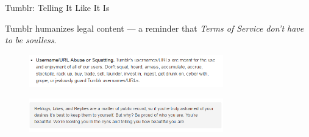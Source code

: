\begin{frame}{Tumblr: Telling It Like It Is}

Tumblr humanizes legal content — a reminder that \textit{Terms of Service don’t have to be soulless}\cite{TUMBLR}.
     \begin{figure}
        \centering
        \includegraphics[width=0.75\textwidth]{images/username.png}
        \label{fig:username}
    \end{figure}     
     \begin{figure}
        \centering
        \includegraphics[width=0.75\textwidth]{images/affirmation.png}
        \label{fig:affirmation}
    \end{figure}     
\end{frame}